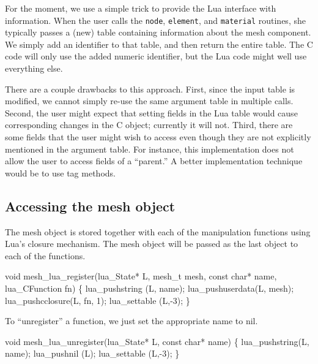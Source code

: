 For the moment, we use a simple trick to provide the Lua interface
with information.  When the user calls the {\tt{}node}, {\tt{}element},
and {\tt{}material} routines, she typically passes a (new) table containing
information about the mesh component.  We simply add an identifier to
that table, and then return the entire table.  The C code will only
use the added numeric identifier, but the Lua code might well use
everything else.

There are a couple drawbacks to this approach.  First, since the input
table is modified, we cannot simply re-use the same argument table 
in multiple calls.  Second, the user might expect that setting fields
in the Lua table would cause corresponding changes in the C object;
currently it will not.  Third, there are some fields that the user
might wish to access even though they are not explicitly mentioned in
the argument table.  For instance, this implementation does not allow
the user to access fields of a ``parent.''  A better implementation
technique would be to use tag methods.


\subsection{Accessing the mesh object}

The mesh object is stored together with each of the manipulation
functions using Lua's closure mechanism.  The mesh object will
be passed as the last object to each of the functions.  %

\nwenddocs{}\endmoddef
void mesh_lua_register(lua_State* L, mesh_t mesh, 
                       const char* name, lua_CFunction fn)
\{
    lua_pushstring  (L, name);
    lua_pushuserdata(L, mesh);
    lua_pushcclosure(L, fn, 1);
    lua_settable    (L,-3);
\}

\nwendcode{}\nwdocspar

To ``unregister'' a function, we just set the appropriate name to nil.

\nwenddocs{}\plusendmoddef
void mesh_lua_unregister(lua_State* L, const char* name)
\{
    lua_pushstring(L, name);
    lua_pushnil   (L);
    lua_settable  (L,-3);
\}

